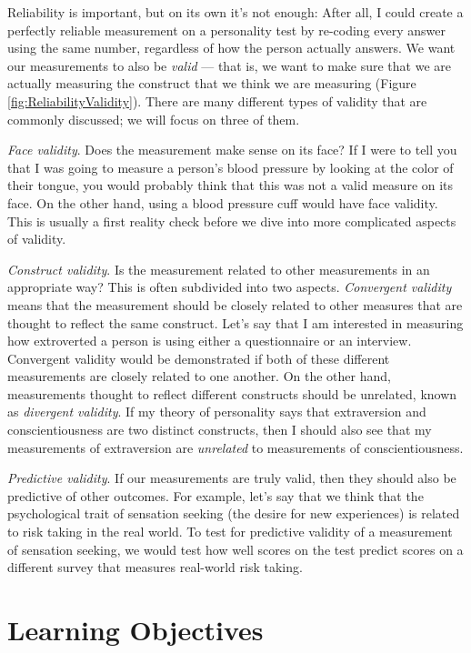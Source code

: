 \documentclass[
  12pt,
]{book}
\begin{document}
Reliability is important, but on its own it's not enough: After all, I could create a perfectly reliable measurement on a personality test by re-coding every answer using the same number, regardless of how the person actually answers. We want our measurements to also be \emph{valid} --- that is, we want to make sure that we are actually measuring the construct that we think we are measuring (Figure \ref{fig:ReliabilityValidity}). There are many different types of validity that are commonly discussed; we will focus on three of them.

\emph{Face validity}. Does the measurement make sense on its face? If I were to tell you that I was going to measure a person's blood pressure by looking at the color of their tongue, you would probably think that this was not a valid measure on its face. On the other hand, using a blood pressure cuff would have face validity. This is usually a first reality check before we dive into more complicated aspects of validity.

\emph{Construct validity}. Is the measurement related to other measurements in an appropriate way? This is often subdivided into two aspects. \emph{Convergent validity} means that the measurement should be closely related to other measures that are thought to reflect the same construct. Let's say that I am interested in measuring how extroverted a person is using either a questionnaire or an interview. Convergent validity would be demonstrated if both of these different measurements are closely related to one another. On the other hand, measurements thought to reflect different constructs should be unrelated, known as \emph{divergent validity}. If my theory of personality says that extraversion and conscientiousness are two distinct constructs, then I should also see that my measurements of extraversion are \emph{unrelated} to measurements of conscientiousness.

\emph{Predictive validity}. If our measurements are truly valid, then they should also be predictive of other outcomes. For example, let's say that we think that the psychological trait of sensation seeking (the desire for new experiences) is related to risk taking in the real world. To test for predictive validity of a measurement of sensation seeking, we would test how well scores on the test predict scores on a different survey that measures real-world risk taking.

\hypertarget{learning-objectives-1}{%
\section{Learning Objectives}\label{learning-objectives-1}}
\end{document}
